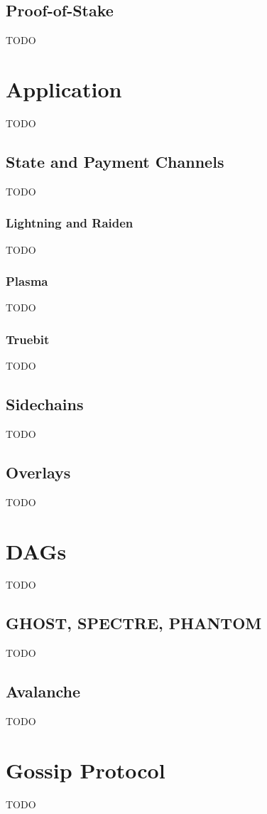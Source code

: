 \documentclass{article}
\begin{document}
\subsection{Proof-of-Stake}
TODO


\section{Application}
TODO

\subsection{State and Payment Channels}
TODO

\subsubsection{Lightning and Raiden}
TODO

\subsubsection{Plasma}
TODO

\subsubsection{Truebit}
TODO

\subsection{Sidechains}
TODO

\subsection{Overlays}
TODO


\section{DAGs}
TODO

\subsection{GHOST, SPECTRE, PHANTOM}
TODO

\subsection{Avalanche}
TODO


\section{Gossip Protocol}
TODO
\end{document}
